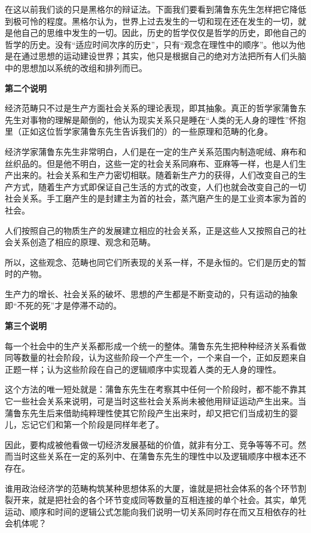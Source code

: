 \documentclass[a4paper,twoside,12pt]{ctexart}
\begin{document}
在这以前我们谈的只是黑格尔的辩证法。下面我们要看到蒲鲁东先生怎样把它降低到极可怜的程度。黑格尔认为，世界上过去发生的一切和现在还在发生的一切，就是他自己的思维中发生的一切。因此，历史的哲学仅仅是哲学的历史，即他自己的哲学的历史。没有“适应时间次序的历史”，只有“观念在理性中的顺序”。他以为他是在通过思想的运动建设世界；其实，他只是根据自己的绝对方法把所有人们头脑中的思想加以系统的改组和排列而已。

\begin{center}
    \textbf{第二个说明}
\end{center}

经济范畴只不过是生产方面社会关系的理论表现，即其抽象。真正的哲学家蒲鲁东先生对事物的理解是颠倒的，他认为现实关系只是睡在“人类的无人身的理性”怀抱里（正如这位哲学家蒲鲁东先生告诉我们的）的一些原理和范畴的化身。

经济学家蒲鲁东先生非常明白，人们是在一定的生产关系范围内制造呢绒、麻布和丝织品的。但是他不明白，这些一定的社会关系同麻布、亚麻等一样，也是人们生产出来的。社会关系和生产力密切相联。随着新生产力的获得，人们改变自己的生产方式，随着生产方式即保证自己生活的方式的改变，人们也就会改变自己的一切社会关系。手工磨产生的是封建主为首的社会，蒸汽磨产生的是工业资本家为首的社会。

人们按照自己的物质生产的发展建立相应的社会关系，正是这些人又按照自己的社会关系创造了相应的原理、观念和范畴。

所以，这些观念、范畴也同它们所表现的关系一样，不是永恒的。它们是历史的暂时的产物。

生产力的增长、社会关系的破坏、思想的产生都是不断变动的，只有运动的抽象即“不死的死”才是停滞不动的。

\begin{center}
    \textbf{第三个说明}
\end{center}

每一个社会中的生产关系都形成一个统一的整体。蒲鲁东先生把种种经济关系看做同等数量的社会阶段，认为这些阶段一个产生一个，一个来自一个，正如反题来自正题一样；认为这些阶段在自己的逻辑顺序中实现着人类的无人身的理性。

这个方法的唯一短处就是：蒲鲁东先生在考察其中任何一个阶段时，都不能不靠其它一些社会关系来说明，可是当时这些社会关系尚未被他用辩证运动产生出来。当蒲鲁东先生后来借助纯粹理性使其它阶段产生出来时，却又把它们当成初生的婴儿，忘记它们和第一个阶段是同样年老了。

因此，要构成被他看做一切经济发展基础的价值，就非有分工、竞争等等不可。然而当时这些关系在一定的系列中、在蒲鲁东先生的理性中以及逻辑顺序中根本还不存在。

谁用政治经济学的范畴构筑某种思想体系的大厦，谁就是把社会体系的各个环节割裂开来，就是把社会的各个环节变成同等数量的互相连接的单个社会。其实，单凭运动、顺序和时间的逻辑公式怎能向我们说明一切关系同时存在而又互相依存的社会机体呢？
\end{document}
